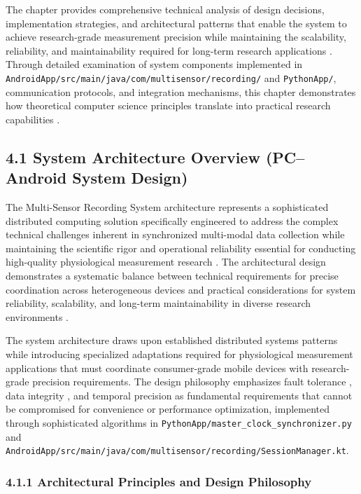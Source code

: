\documentclass[11pt,a4paper]{article}
\begin{document}
The chapter provides comprehensive technical analysis of design decisions, implementation strategies, and architectural
patterns that enable the system to achieve research-grade measurement precision while maintaining the scalability,
reliability, and maintainability required for long-term research applications \cite{McConnell2004}. Through detailed
examination of system components implemented in \texttt{AndroidApp/src/main/java/com/multisensor/recording/} and
\texttt{PythonApp/}, communication protocols, and integration mechanisms, this chapter demonstrates how theoretical
computer science principles translate into practical research capabilities \cite{Brooks1995}.

\subsection{4.1 System Architecture Overview (PC–Android System Design)}

The Multi-Sensor Recording System architecture represents a sophisticated distributed computing solution specifically
engineered to address the complex technical challenges inherent in synchronized multi-modal data collection while
maintaining the scientific rigor and operational reliability essential for conducting high-quality physiological
measurement research \cite{Healey2005, Boucsein2012}. The architectural design demonstrates a systematic balance between
technical requirements for precise coordination across heterogeneous devices \cite{Lamport1978} and practical considerations
for system reliability, scalability, and long-term maintainability in diverse research environments \cite{Avizienis2004}.

The system architecture draws upon established distributed systems patterns \cite{Buschmann1996} while introducing
specialized adaptations required for physiological measurement applications that must coordinate consumer-grade mobile
devices with research-grade precision requirements. The design philosophy emphasizes fault tolerance \cite{Gray1993}, data
integrity \cite{Date2003}, and temporal precision \cite{Mills1991} as fundamental requirements that cannot be compromised for
convenience or performance optimization, implemented through sophisticated algorithms in
\texttt{PythonApp/master\_clock\_synchronizer.py} and \texttt{AndroidApp/src/main/java/com/multisensor/recording/SessionManager.kt}.

\subsubsection{4.1.1 Architectural Principles and Design Philosophy}
\end{document}
